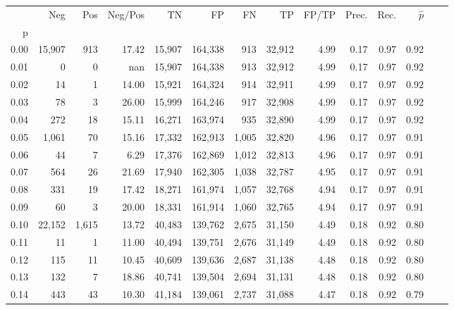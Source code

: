 \begin{tabular}{rrrrrrrrrrrrrr}
\toprule
{} &     Neg &    Pos & Neg/Pos &       TN &       FP &      FN &      TP & FP/TP & Prec. &  Rec. & $\hat{p}$ \\
p    &         &        &         &          &          &         &         &       &       &       &           \\
\midrule
0.00 &  15,907 &    913 &   17.42 &   15,907 &  164,338 &     913 &  32,912 &  4.99 &  0.17 &  0.97 &      0.92 \\
0.01 &       0 &      0 &     nan &   15,907 &  164,338 &     913 &  32,912 &  4.99 &  0.17 &  0.97 &      0.92 \\
0.02 &      14 &      1 &   14.00 &   15,921 &  164,324 &     914 &  32,911 &  4.99 &  0.17 &  0.97 &      0.92 \\
0.03 &      78 &      3 &   26.00 &   15,999 &  164,246 &     917 &  32,908 &  4.99 &  0.17 &  0.97 &      0.92 \\
0.04 &     272 &     18 &   15.11 &   16,271 &  163,974 &     935 &  32,890 &  4.99 &  0.17 &  0.97 &      0.92 \\
0.05 &   1,061 &     70 &   15.16 &   17,332 &  162,913 &   1,005 &  32,820 &  4.96 &  0.17 &  0.97 &      0.91 \\
0.06 &      44 &      7 &    6.29 &   17,376 &  162,869 &   1,012 &  32,813 &  4.96 &  0.17 &  0.97 &      0.91 \\
0.07 &     564 &     26 &   21.69 &   17,940 &  162,305 &   1,038 &  32,787 &  4.95 &  0.17 &  0.97 &      0.91 \\
0.08 &     331 &     19 &   17.42 &   18,271 &  161,974 &   1,057 &  32,768 &  4.94 &  0.17 &  0.97 &      0.91 \\
0.09 &      60 &      3 &   20.00 &   18,331 &  161,914 &   1,060 &  32,765 &  4.94 &  0.17 &  0.97 &      0.91 \\
0.10 &  22,152 &  1,615 &   13.72 &   40,483 &  139,762 &   2,675 &  31,150 &  4.49 &  0.18 &  0.92 &      0.80 \\
0.11 &      11 &      1 &   11.00 &   40,494 &  139,751 &   2,676 &  31,149 &  4.49 &  0.18 &  0.92 &      0.80 \\
0.12 &     115 &     11 &   10.45 &   40,609 &  139,636 &   2,687 &  31,138 &  4.48 &  0.18 &  0.92 &      0.80 \\
0.13 &     132 &      7 &   18.86 &   40,741 &  139,504 &   2,694 &  31,131 &  4.48 &  0.18 &  0.92 &      0.80 \\
0.14 &     443 &     43 &   10.30 &   41,184 &  139,061 &   2,737 &  31,088 &  4.47 &  0.18 &  0.92 &      0.79 \\

\end{tabular}
